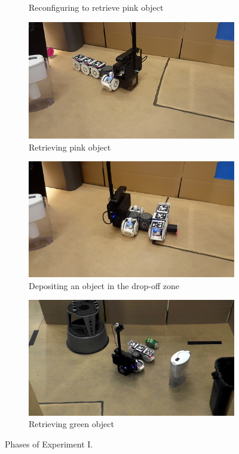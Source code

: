\documentclass[journal]{IEEEtran}
\begin{document}
\begin{figure}[t]
\begin{subfigure}[t]{0.32\textwidth}
        \caption{Reconfiguring to retrieve pink object}
    \end{subfigure}
    \begin{subfigure}[t]{0.32\textwidth}
        \includegraphics[width=\textwidth]{images/pink_retrieval.png}
        \caption{Retrieving pink object}
        \label{fig:pink_grab}
    \end{subfigure}
    \begin{subfigure}[t]{0.32\textwidth}
        \includegraphics[width=\textwidth]{images/dropoff.jpg}
        \caption{Depositing an object in the drop-off zone}
        \label{fig:dropoff}
    \end{subfigure}
    \begin{subfigure}[t]{0.32\textwidth}
        \includegraphics[width=\textwidth]{images/green_retrieval.jpg}
        \caption{Retrieving green object}
    \end{subfigure}
      \caption{Phases of Experiment I.}
      \label{fig:demo}
   \vspace{-1em}
   \end{figure}
\end{document}
